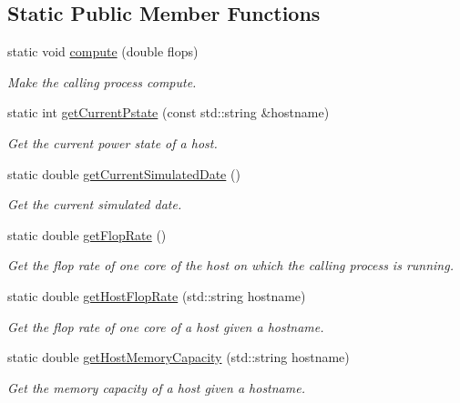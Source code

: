 \subsection*{Static Public Member Functions}
\begin{DoxyCompactItemize}
\item 
static void \hyperlink{classwrench_1_1_simulation_a26092a37ea422703f0880748844cf820}{compute} (double flops)
\begin{DoxyCompactList}\small\item\em Make the calling process compute. \end{DoxyCompactList}\item 
static int \hyperlink{classwrench_1_1_simulation_a3d204b229feec1eee4f1e82d92490d81}{get\+Current\+Pstate} (const std\+::string \&hostname)
\begin{DoxyCompactList}\small\item\em Get the current power state of a host. \end{DoxyCompactList}\item 
static double \hyperlink{classwrench_1_1_simulation_a9721ec8f4c31dcb6bdb032c9ba08f815}{get\+Current\+Simulated\+Date} ()
\begin{DoxyCompactList}\small\item\em Get the current simulated date. \end{DoxyCompactList}\item 
static double \hyperlink{classwrench_1_1_simulation_ae74b3ff1b394b4bc2986190412f4f32b}{get\+Flop\+Rate} ()
\begin{DoxyCompactList}\small\item\em Get the flop rate of one core of the host on which the calling process is running. \end{DoxyCompactList}\item 
static double \hyperlink{classwrench_1_1_simulation_a736b72b8fb5343f93d3a461f85f221ef}{get\+Host\+Flop\+Rate} (std\+::string hostname)
\begin{DoxyCompactList}\small\item\em Get the flop rate of one core of a host given a hostname. \end{DoxyCompactList}\item 
static double \hyperlink{classwrench_1_1_simulation_a757dde71d164a89ff52e49c4c52af0b5}{get\+Host\+Memory\+Capacity} (std\+::string hostname)
\begin{DoxyCompactList}\small\item\em Get the memory capacity of a host given a hostname. \end{DoxyCompactList}\item 

\end{DoxyCompactItemize}
